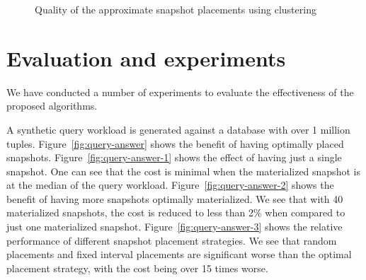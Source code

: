 \begin{figure}[t]
\centering
{}
\hfill
{}
    \caption{Quality of the approximate snapshot placements using clustering}
    \label{fig:place}
\end{figure}

\section{Evaluation and experiments}

We have conducted a number of experiments to evaluate the effectiveness of the
proposed algorithms.

A synthetic query workload is generated against a database with over 1
million tuples.  Figure~\ref{fig:query-answer} shows the benefit of having
optimally placed snapshots.  Figure~\ref{fig:query-answer-1} shows the effect of
having just a single snapshot.  One can see that the cost is minimal when the
materialized snapshot is at the median of the query workload.
Figure~\ref{fig:query-answer-2} shows the benefit of having more snapshots
optimally materialized.  We see that with 40 materialized snapshots, the cost is
reduced to less than
2\% when compared to just one materialized snapshot.
Figure~\ref{fig:query-answer-3} shows the
relative performance of different snapshot placement strategies.  We see that
random placements and fixed interval placements are significant worse than the
optimal placement strategy, with the cost being over 15 times worse.

